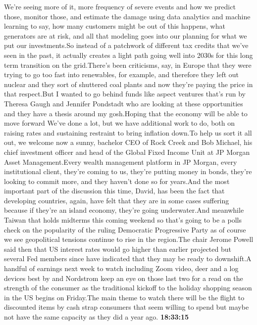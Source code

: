 \documentclass{article}%
\begin{document}
We're seeing more of it, more frequency of severe events and how we predict those, monitor those, and estimate the damage using data analytics and machine learning to say, how many customers might be out of this happens, what generators are at risk, and all that modeling goes into our planning for what we put our investments.So instead of a patchwork of different tax credits that we've seen in the past, it actually creates a light path going well into 2030s for this long term transition on the grid.There's been criticisms, say, in Europe that they were trying to go too fast into renewables, for example, and therefore they left out nuclear and they sort of shuttered coal plants and now they're paying the price in that respect.But I wanted to go behind funds like aspect ventures that's run by Theresa Gaugh and Jennifer Pondstadt who are looking at these opportunities and they have a thesis around my gosh.Hoping that the economy will be able to move forward  We've done a lot, but we have additional work to do, both on raising rates and sustaining restraint to bring inflation down.To help us sort it all out, we welcome now a sunny, bachelor CEO of Rock Creek and Bob Michael, his chief investment officer and head of the Global Fixed Income Unit at JP Morgan Asset Management.Every wealth management platform in JP Morgan, every institutional client, they're coming to us, they're putting money in bonds, they're looking to commit more, and they haven't done so for years.And the most important part of the discussion this time, David, has been the fact that developing countries, again, have felt that they are in some cases suffering because if they're an island economy, they're going underwater.And meanwhile Taiwan that holds midterms this coming weekend so that's going to be a polls check on the popularity of the ruling Democratic Progressive Party as of course we see geopolitical tensions continue to rise in the region.The chair Jerome Powell said then that US interest rates would go higher than earlier projected but several Fed members since have indicated that they may be ready to downshift.A handful of earnings next week to watch including Zoom video, deer and a log devices best by and Nordstrom keep an eye on those last two for a read on the strength of the consumer as the traditional kickoff to the holiday shopping season in the US begins on Friday.The main theme to watch there will be the flight to discounted items by cash strap consumers that seem willing to spend but maybe not have the same capacity as they did a year ago.%
\textbf{18:33:15}%
\newline%
\end{document}
